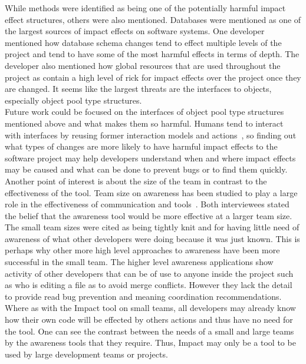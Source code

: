 \documentclass[conference]{IEEEtran}
\begin{document}
While methods were identified as being one of the potentially harmful impact effect
structures, others were also mentioned. Databases were mentioned as one of the largest
sources of impact effects on software systems. One developer mentioned how database
schema changes tend to effect multiple levels of the project and tend to have some of
the most harmful effects in terms of depth. The developer also mentioned how global
resources that are used throughout the project as contain a high level of rick for impact
effects over the project once they are changed. It seems like the largest threats are
the interfaces to objects, especially object pool type structures.\\

Future work could be focused on the interfaces of object pool type structures mentioned
above and what makes them so harmful. Humans tend to interact with interfaces
by reusing former interaction models and actions~\cite{Besnard:2005:ICC},
so finding out what types of changes are more
likely to have harmful impact effects to the software project may help developers understand
when and where impact effects may be caused and what can be done to prevent bugs 
or to find them quickly.\\

Another point of interest is about the size of the team in contrast to the effectiveness
of the tool. Team size on awareness has been studied to play a large role in the effectiveness
of communication and tools~\cite{Bradner:2003:ETS}. Both interviewees stated the belief that the awareness tool would be more
effective at a larger team size. The small team sizes were cited as being tightly knit and
for having little need of awareness of what other developers were doing because it
was just known. This is perhaps why other more high level approaches to awareness have
been more successful in the small team. The higher level awareness applications 
show activity of other developers that can be of use to anyone inside the project such 
as who is editing a file as to avoid merge conflicts. However they lack the detail to
provide read bug prevention and meaning coordination recommendations. Where as
with the Impact tool on small teams, all developers may already know how their own code
will be effected by others actions and thus have no need for the tool. One can see the
contrast between the needs of a small and large teams by the awareness tools that they
require. Thus, Impact may only be a tool to be used by large development teams or
projects.\\
\end{document}

